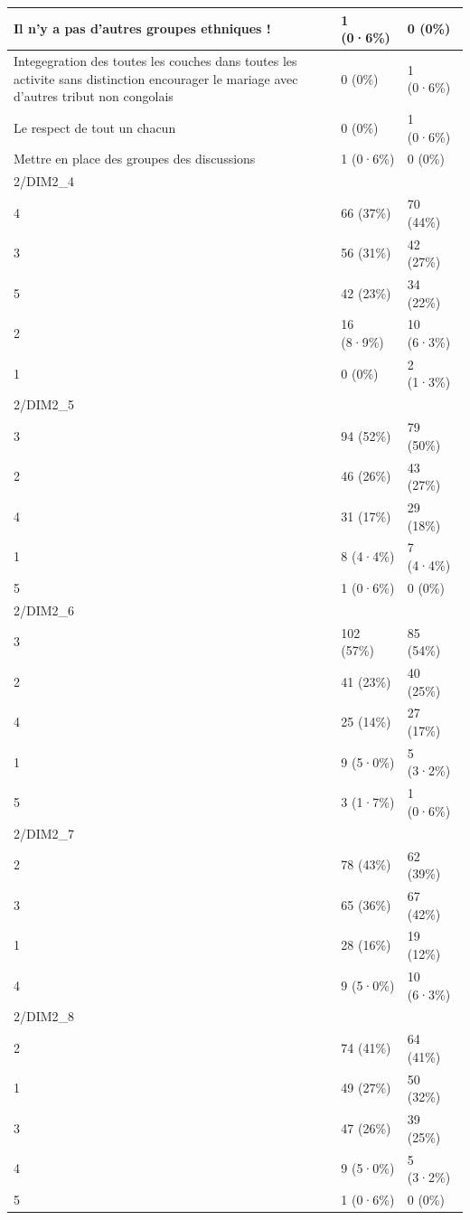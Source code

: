 \documentclass[
]{book}
\begin{document}
\begin{tabular}{l|l|l}
\hline
Il n'y a pas d'autres groupes ethniques ! & 1 (0·6\%) & 0 (0\%)\\
\hline
Integegration des toutes les couches dans toutes les activite sans distinction encourager le mariage avec d'autres tribut non congolais & 0 (0\%) & 1 (0·6\%)\\
\hline
Le respect de tout un  chacun & 0 (0\%) & 1 (0·6\%)\\
\hline
Mettre en place des groupes des discussions & 1 (0·6\%) & 0 (0\%)\\
\hline
2/DIM2\_4 &  & \\
\hline
4 & 66 (37\%) & 70 (44\%)\\
\hline
3 & 56 (31\%) & 42 (27\%)\\
\hline
5 & 42 (23\%) & 34 (22\%)\\
\hline
2 & 16 (8·9\%) & 10 (6·3\%)\\
\hline
1 & 0 (0\%) & 2 (1·3\%)\\
\hline
2/DIM2\_5 &  & \\
\hline
3 & 94 (52\%) & 79 (50\%)\\
\hline
2 & 46 (26\%) & 43 (27\%)\\
\hline
4 & 31 (17\%) & 29 (18\%)\\
\hline
1 & 8 (4·4\%) & 7 (4·4\%)\\
\hline
5 & 1 (0·6\%) & 0 (0\%)\\
\hline
2/DIM2\_6 &  & \\
\hline
3 & 102 (57\%) & 85 (54\%)\\
\hline
2 & 41 (23\%) & 40 (25\%)\\
\hline
4 & 25 (14\%) & 27 (17\%)\\
\hline
1 & 9 (5·0\%) & 5 (3·2\%)\\
\hline
5 & 3 (1·7\%) & 1 (0·6\%)\\
\hline
2/DIM2\_7 &  & \\
\hline
2 & 78 (43\%) & 62 (39\%)\\
\hline
3 & 65 (36\%) & 67 (42\%)\\
\hline
1 & 28 (16\%) & 19 (12\%)\\
\hline
4 & 9 (5·0\%) & 10 (6·3\%)\\
\hline
2/DIM2\_8 &  & \\
\hline
2 & 74 (41\%) & 64 (41\%)\\
\hline
1 & 49 (27\%) & 50 (32\%)\\
\hline
3 & 47 (26\%) & 39 (25\%)\\
\hline
4 & 9 (5·0\%) & 5 (3·2\%)\\
\hline
5 & 1 (0·6\%) & 0 (0\%)\\

\end{tabular}
\end{document}
